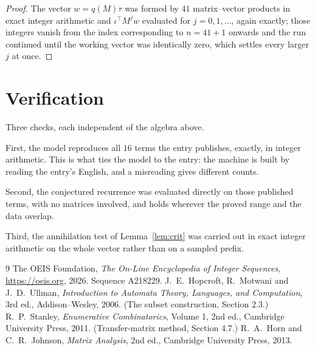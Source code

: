 \documentclass[11pt,a4paper]{article}
\theoremstyle{plain}
\theoremstyle{definition}
\begin{document}
\begin{proof}
The vector $w=q(M)\tau$ was formed by $41$ matrix--vector products in exact integer
arithmetic and $\iota^{\!\top}M^{j}w$ evaluated for $j=0,1,\dots$, again exactly; those
integers vanish from the index corresponding to $n=41+1$ onwards and the run continued
until the working vector was identically zero, which settles every larger $j$ at once.
\end{proof}

\section{Verification}

Three checks, each independent of the algebra above.

First, the model reproduces all $16$ terms the entry publishes, exactly, in integer
arithmetic. This is what ties the model to the entry: the machine is built by reading the
entry's English, and a misreading gives different counts.

Second, the conjectured recurrence was evaluated directly on those published terms, with no
matrices involved, and holds wherever the proved range and the data overlap.

Third, the annihilation test of Lemma~\ref{lem:crit} was carried out in exact integer
arithmetic on the whole vector rather than on a sampled prefix.

\begin{thebibliography}{9}
 The OEIS Foundation, \emph{The On-Line Encyclopedia of Integer
Sequences}, \url{https://oeis.org}, 2026. Sequence A218229.
 J.~E.~Hopcroft, R.~Motwani and J.~D.~Ullman, \emph{Introduction to Automata
Theory, Languages, and Computation}, 3rd ed., Addison--Wesley, 2006. (The subset
construction, Section 2.3.)
 R.~P.~Stanley, \emph{Enumerative Combinatorics}, Volume 1, 2nd ed.,
Cambridge University Press, 2011. (Transfer-matrix method, Section 4.7.)
 R.~A.~Horn and C.~R.~Johnson, \emph{Matrix Analysis}, 2nd ed., Cambridge
University Press, 2013.
\end{thebibliography}
\end{document}
